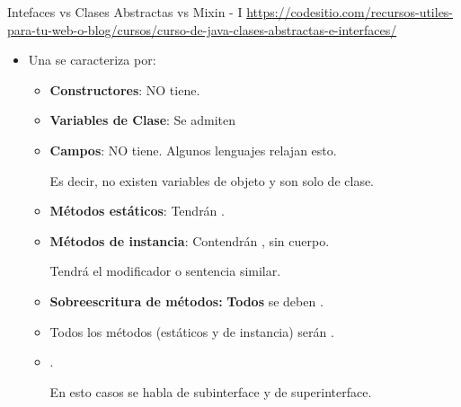 \documentclass[10pt, envcountsect , spanish]{beamer}
\begin{document}
\begin{frame}{Intefaces vs Clases Abstractas vs Mixin - I}
{\tiny \url{https://codesitio.com/recursos-utiles-para-tu-web-o-blog/cursos/curso-de-java-clases-abstractas-e-interfaces/}} %

\Large 

\begin{itemize}

\item Una  se caracteriza por:



\begin{itemize} \large
\item \textbf{Constructores}: NO tiene.

\item \textbf{Variables de Clase}: Se admiten

\item \textbf{Campos}: NO tiene. Algunos lenguajes relajan esto.


Es decir, no existen variables de objeto y son solo de clase.

\item \textbf{Métodos estáticos}: Tendrán . 

\item \textbf{Métodos de instancia}: Contendrán , sin cuerpo. 

Tendrá el modificador  o sentencia similar.

\item \textbf{Sobreescritura de métodos:} \textbf{Todos} se deben  .

\item Todos los métodos (estáticos y de instancia) serán  .


\item {}.

\hfil En esto casos se habla de subinterface y de superinterface.

\end{itemize}

\end{itemize}

\end{frame}
\end{document}
